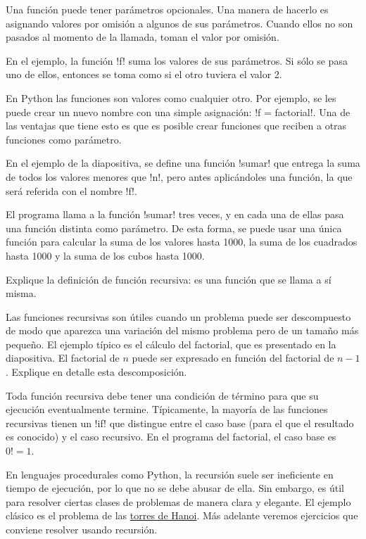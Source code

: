 \documentclass[10pt]{article}
\begin{document}

  Una función puede tener parámetros opcionales.
  Una manera de hacerlo es asignando valores por omisión
  a algunos de sus parámetros.
  Cuando ellos no son pasados al momento de la llamada,
  toman el valor por omisión.

  En el ejemplo,
  la función \li!f! suma los valores de sus parámetros.
  Si sólo se pasa uno de ellos,
  entonces se toma como si el otro tuviera el valor 2.


  En Python las funciones son valores como cualquier otro.
  Por ejemplo, se les puede crear un nuevo nombre
  con una simple asignación: \li!f = factorial!.
  Una de las ventajas que tiene esto
  es que es posible crear funciones que reciben a otras funciones como parámetro.

  En el ejemplo de la diapositiva,
  se define una función \li!sumar!
  que entrega la suma de todos los valores menores que \li!n!,
  pero antes aplicándoles una función,
  la que será referida con el nombre \li!f!.

  El programa llama a la función \li!sumar! tres veces,
  y en cada una de ellas pasa una función distinta como parámetro.
  De esta forma, se puede usar una única función
  para calcular la suma de los valores hasta 1000,
  la suma de los cuadrados hasta 1000
  y la suma de los cubos hasta 1000.


  Explique la definición de función recursiva:
  es una función que se llama a sí misma.

  Las funciones recursivas son útiles cuando un problema
  puede ser descompuesto de modo que aparezca una variación del mismo problema
  pero de un tamaño más pequeño.
  El ejemplo típico es el cálculo del factorial,
  que es presentado en la diapositiva.
  El factorial de \(n\) puede ser expresado en función del factorial de \(n - 1\).
  Explique en detalle esta descomposición.

  Toda función recursiva debe tener una condición de término
  para que su ejecución eventualmente termine.
  Típicamente, la mayoría de las funciones recursivas
  tienen un \li!if! que distingue entre el caso base
  (para el que el resultado es conocido)
  y el caso recursivo.
  En el programa del factorial,
  el caso base es \(0! = 1\).

  En lenguajes procedurales como Python,
  la recursión suele ser ineficiente en tiempo de ejecución,
  por lo que no se debe abusar de ella.
  Sin embargo, es útil para resolver ciertas clases de problemas
  de manera clara y elegante.
  El ejemplo clásico es el problema de las \href{http://en.wikipedia.org/wiki/Tower_of_Hanoi}{torres de Hanoi}.
  Más adelante veremos ejercicios que conviene resolver usando recursión.
\end{document}
